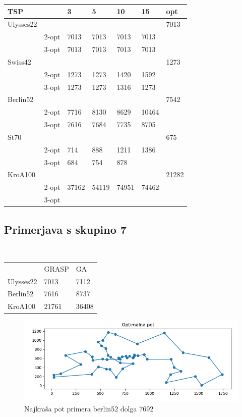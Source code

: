 \documentclass[12pt,a4paper]{amsart}
\theoremstyle{definition} %
\theoremstyle{plain} %
\begin{document}
\begin{table}[h]
\begin{tabular}{lllllll}
\rowcolor[HTML]{FFCCC9} 
TSP       &      & 3 & 5 & 10 & 15 &opt \\ \hline
Ulysses22 &      &   &   &    &  &7013  \\
          & 2-opt & 7013  &  7013 & 7013   & 7013   &\\
          & 3-opt &   7013&  7013 &  7013  &  7013 & \\
Swiss42   &      &   &   &    &   &1273 \\
	& 2-opt &   1273&  1273 &   1420 &  1592 & \\
          & 3-opt &  1273 &  1273 & 1316   &  1273 & \\
Berlin52 &      &   &   &    &   &7542 \\
	 & 2-opt &  7716 & 8130 &   8629 &  10464 & \\
          & 3-opt &  7616 &  7684 &  7735  & 8705  & \\
St70      &      &   &   &    &  & 675 \\
	& 2-opt &  714 &  888 &   1211 &  1386 & \\
          & 3-opt &  684 &  754 &   878 &   & \\
KroA100   &      &   &   &    &  &21282  \\
	& 2-opt &  37162 &  54119 &   74951 &   74462& \\
          & 3-opt &   &   &    &   &
\end{tabular}
\end{table}



\subsection{Primerjava s skupino 7} ~\\

\begin{table}[h]
\begin{tabular}{lll}
\rowcolor[HTML]{FFCCC9} 
          & GRASP & GA \\
Ulysses22 & 7013  & 7112               \\
Berlin52  & 7616  & 8737               \\
KroA100   & 21761 & 36408             
\end{tabular}
\end{table}

\begin{figure}[h]
\caption{Najkraša pot primera berlin52 dolga 7692}
\centering
\includegraphics[scale =0.5]{berlin_7692}
\end{figure}
\end{document}
